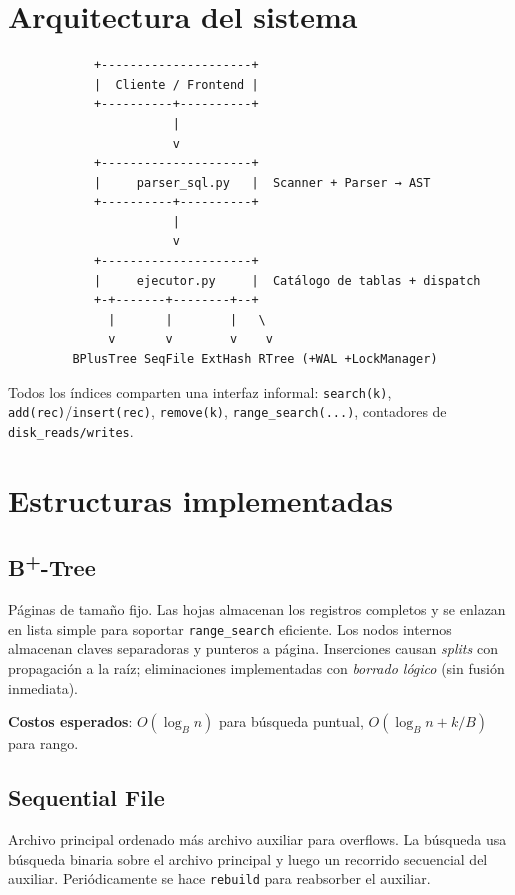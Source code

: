 \documentclass[11pt,a4paper]{article}
\begin{document}
\section{Arquitectura del sistema}

\begin{verbatim}
            +---------------------+
            |  Cliente / Frontend |
            +----------+----------+
                       |
                       v
            +---------------------+
            |     parser_sql.py   |  Scanner + Parser → AST
            +----------+----------+
                       |
                       v
            +---------------------+
            |     ejecutor.py     |  Catálogo de tablas + dispatch
            +-+-------+--------+--+
              |       |        |   \
              v       v        v    v
         BPlusTree SeqFile ExtHash RTree (+WAL +LockManager)
\end{verbatim}

Todos los índices comparten una interfaz informal:
\texttt{search(k)}, \texttt{add(rec)}/\texttt{insert(rec)}, \texttt{remove(k)},
\texttt{range\_search(...)}, contadores de \texttt{disk\_reads/writes}.

\section{Estructuras implementadas}

\subsection{B\textsuperscript{+}-Tree}
Páginas de tamaño fijo. Las hojas almacenan los registros completos y se
enlazan en lista simple para soportar \texttt{range\_search} eficiente.
Los nodos internos almacenan claves separadoras y punteros a página.
Inserciones causan \emph{splits} con propagación a la raíz; eliminaciones
implementadas con \emph{borrado lógico} (sin fusión inmediata).

\textbf{Costos esperados}: $O(\log_B n)$ para búsqueda puntual,
$O(\log_B n + k/B)$ para rango.

\subsection{Sequential File}
Archivo principal ordenado más archivo auxiliar para overflows. La
búsqueda usa búsqueda binaria sobre el archivo principal y luego un
recorrido secuencial del auxiliar. Periódicamente se hace \texttt{rebuild}
para reabsorber el auxiliar.
\end{document}
